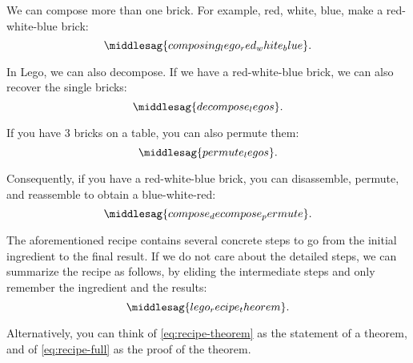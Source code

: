 We can compose more than one brick.
For example, red, white, blue, make a red-white-blue brick:
%
\begin{equation}
    \middlesag{composing_lego_red_white_blue}.
\end{equation}

In Lego, we can also decompose.
If we have a red-white-blue brick, we can also recover the single bricks:
%
\begin{equation}
    \middlesag{decompose_legos}.
\end{equation}

If you have 3 bricks on a table, you can also permute them:
%
\begin{equation}
    \middlesag{permute_legos}.
\end{equation}

Consequently, if you have a red-white-blue brick, you can disassemble, permute, and reassemble to obtain a blue-white-red:
%
\begin{equation}
    \label{eq:recipe-full}
    \middlesag{compose_decompose_permute}.
\end{equation}

The aforementioned recipe contains several concrete steps to go from the initial ingredient to the final result.
If we do not care about the detailed steps, we can summarize the recipe as follows, by eliding the intermediate steps and only remember the ingredient and the results:
%
\begin{equation}
    \label{eq:recipe-theorem}
    \middlesag{lego_recipe_theorem}.
\end{equation}

Alternatively, you can think of \cref{eq:recipe-theorem} as the statement of a theorem, and of \cref{eq:recipe-full} as the proof of the theorem.

